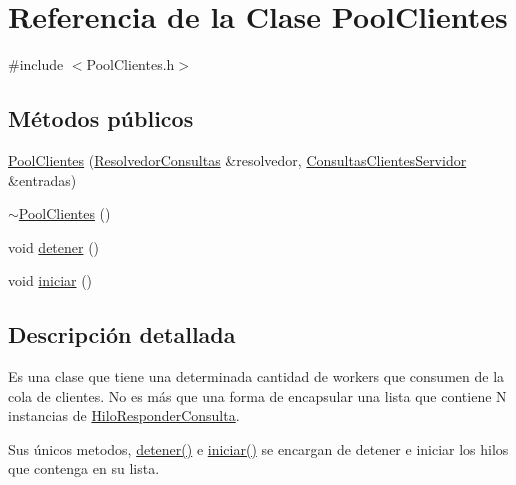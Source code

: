 \hypertarget{classPoolClientes}{\section{\-Referencia de la \-Clase \-Pool\-Clientes}
\label{classPoolClientes}
}


{\ttfamily \#include $<$\-Pool\-Clientes.\-h$>$}

\subsection*{\-Métodos públicos}
\begin{DoxyCompactItemize}
\item 
\hyperlink{classPoolClientes_a533c69156754c4b45cebad5bb50567ad}{\-Pool\-Clientes} (\hyperlink{classResolvedorConsultas}{\-Resolvedor\-Consultas} \&resolvedor, \hyperlink{classBLQueue}{\-Consultas\-Clientes\-Servidor} \&entradas)
\item 
\hyperlink{classPoolClientes_ad1303833692f98080ac2c2cfe26ae41b}{$\sim$\-Pool\-Clientes} ()
\item 
void \hyperlink{classPoolClientes_ae930d0c64dbb0e1adf68839e5c8794e1}{detener} ()
\item 
void \hyperlink{classPoolClientes_ac294e117a0bc44724abbb1de36a821da}{iniciar} ()
\end{DoxyCompactItemize}


\subsection{\-Descripción detallada}
\-Es una clase que tiene una determinada cantidad de workers que consumen de la cola de clientes. \-No es más que una forma de encapsular una lista que contiene \-N instancias de \hyperlink{classHiloResponderConsulta}{\-Hilo\-Responder\-Consulta}.

\-Sus únicos metodos, \hyperlink{classPoolClientes_ae930d0c64dbb0e1adf68839e5c8794e1}{detener()} e \hyperlink{classPoolClientes_ac294e117a0bc44724abbb1de36a821da}{iniciar()} se encargan de detener e iniciar los hilos que contenga en su lista. 

